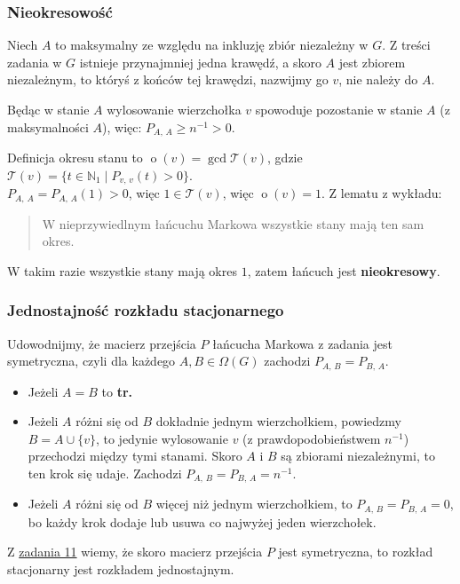 \subsubsection*{Nieokresowość}
Niech \(A\) to maksymalny ze względu na inkluzję zbiór niezależny w \(G\).
Z treści zadania w \(G\) istnieje przynajmniej jedna krawędź, a skoro \(A\)
jest zbiorem niezależnym, to któryś z końców tej krawędzi, nazwijmy go \(v\),
nie należy do \(A\).

Będąc w stanie \(A\) wylosowanie wierzchołka \(v\) spowoduje pozostanie w
stanie \(A\) (z maksymalności \(A\)), więc: \(P_{A,\,A} \geq n^{-1} > 0\).

Definicja okresu stanu to
\(\operatorname{o}(v) = \gcd \mathcal{T}(v)\), gdzie
\(
\mathcal{T}(v) = \{ t \in \mathbb{N}_1 \mid P_{v,\,v}(t) > 0 \}
\).\\
\(P_{A,\,A} = P_{A,\,A}(1) > 0\), więc \(1 \in \mathcal{T}(v)\), więc
\(\operatorname{o}(v) = 1\). Z lematu z wykładu:
\begin{quote}
	W nieprzywiedlnym łańcuchu Markowa wszystkie stany mają ten sam okres.
\end{quote}
W takim razie wszystkie stany mają okres \(1\), zatem łańcuch jest
\textbf{nieokresowy}.

\subsubsection*{Jednostajność rozkładu stacjonarnego}
Udowodnijmy, że macierz przejścia \(P\) łańcucha Markowa z zadania jest
symetryczna, czyli dla każdego \(A, B \in \Omega(G)\) zachodzi
\(P_{A,\,B} = P_{B,\,A}\).

\begin{itemize}
	\item Jeżeli \(A = B\) to \textbf{tr.}

	\item Jeżeli \(A\) różni się od \(B\) dokładnie jednym wierzchołkiem,
	      powiedzmy \(B = A \cup \{v\}\), to jedynie wylosowanie \(v\)
	      (z prawdopodobieństwem \(n^{-1}\)) przechodzi między tymi stanami.
	      Skoro \(A\) i \(B\) są zbiorami niezależnymi, to ten krok się udaje.
	      Zachodzi \(P_{A,\,B} = P_{B,\,A} = n^{-1}\).

	\item Jeżeli \(A\) różni się od \(B\) więcej niż jednym wierzchołkiem,
	      to \(P_{A,\,B} = P_{B,\,A} = 0\), bo każdy krok dodaje lub usuwa co najwyżej
	      jeden wierzchołek.
\end{itemize}

Z \hyperref[set07.task11]{zadania 11} wiemy, że skoro macierz przejścia
\(P\) jest symetryczna, to rozkład stacjonarny jest rozkładem jednostajnym.
